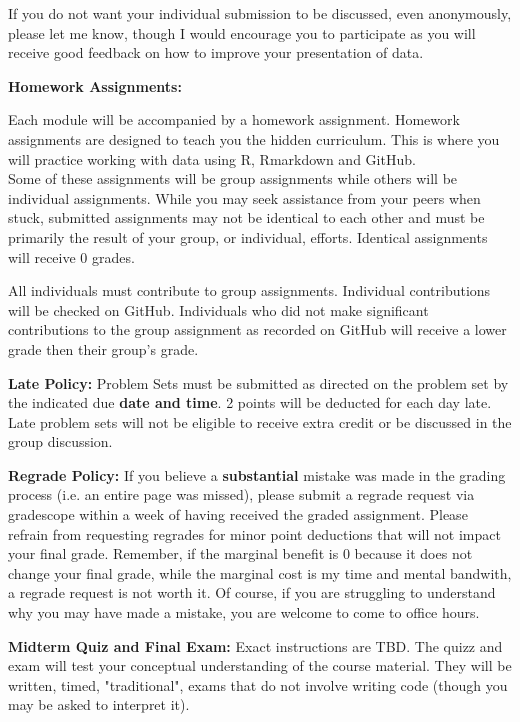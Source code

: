 \documentclass[a4paper, 10pt]{article}
\begin{document}
\noindent If you do not want your individual submission to be discussed, even anonymously, please let me know, though I would encourage you to participate as you will receive good feedback on how to improve your presentation of data. 

\noindent\textbf{Homework Assignments:}

\noindent Each module will be accompanied by a homework assignment. Homework assignments are designed to teach you the hidden curriculum. This is where you will practice working with data  using R, Rmarkdown and GitHub. \\
Some of these assignments will be group assignments while others will be individual assignments. While you may seek assistance from your peers when stuck, submitted assignments may not be identical to each other and must be primarily the result of your group, or individual, efforts. Identical assignments will receive 0 grades. 

\noindent All individuals must contribute to group assignments. Individual contributions will be checked on GitHub. Individuals who did not make significant contributions to the group assignment as recorded on GitHub will receive a lower grade then their group's grade.

\noindent\textbf{Late Policy:} Problem Sets must be submitted as directed on the problem set by the indicated due \textbf{date and time}. 2 points will be deducted for each day late. Late problem sets will not be eligible to receive extra credit or be discussed in the group discussion. 

\noindent\textbf{Regrade Policy:} If you believe a \textbf{substantial} mistake was made in the grading process (i.e. an entire page was missed), please submit a regrade request via gradescope within a week of having received the graded assignment. Please refrain from requesting regrades for minor point deductions that will not impact your final grade. Remember, if the marginal benefit is 0 because it does not change your final grade, while the marginal cost is my time and mental bandwith, a regrade request is not worth it. Of course, if you are struggling to understand why you may have made a mistake, you are welcome to come to office hours.  

\noindent\textbf{Midterm Quiz and Final Exam:}  Exact instructions are TBD.  The quizz and exam will test your conceptual understanding of the course material. They will be written, timed, "traditional", exams that do not involve writing code (though you may be asked to interpret it).
\end{document}
